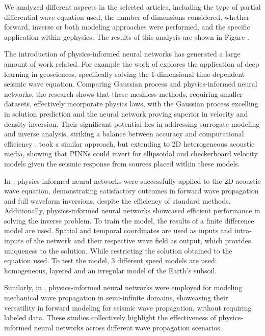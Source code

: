 \documentclass[11pt,twoside]{article}
\begin{document}
We analyzed different aspects in the selected articles, including the type of partial differential wave equation used, the number of dimensions 
considered, whether forward, inverse or both modeling approaches were performed, and the specific application within gephysics. The results 
of this analysis are shown in Figure  .

The introduction of physics-informed neural networks has generated a large amount of work related. For example the work of 
 explores the application of deep learning in geosciences, specifically solving the 1-dimensional 
time-dependent seismic wave equation. Comparing Gaussian process and physics-informed neural networks, the research shows that these meshless 
methods, requiring smaller datasets, effectively incorporate physics laws, with the Gaussian process excelling in solution prediction and the 
neural network proving superior in velocity and density inversion. Their significant potential lies in addressing surrogate modeling and 
inverse analysis, striking a balance between accuracy and computational efficiency \citep{Song2022}.  took a similar 
approach, but extending to 2D heterogeneous acoustic media, showing that PINNs could invert for ellipsoidal and checkerboard velocity models 
given the seismic response from sources placed within these models.

In , physics-informed neural networks were successfully applied to the 2D acoustic wave 
equation, demonstrating satisfactory outcomes in forward wave propagation and full waveform inversions, despite the efficiency of standard 
methods. Additionally, physics-informed neural networks showcased efficient performance in solving the inverse problem. To train the model, 
the results of a finite difference model are used. Spatial and temporal coordinates are used as inputs and intra-inputs of the network and 
their respective wave field as output, which provides uniqueness to the solution. While restricting the solution obtained to the equation 
used. To test the model, 3 different speed models are used: homogeneous, layered and an irregular model of the Earth's subsoil.

Similarly, in , physics-informed neural networks were employed for modeling mechanical wave propagation 
in semi-infinite domains, showcasing their versatility in forward modeling for seismic wave propagation, without requiring labeled data. 
These studies collectively highlight the effectiveness of physics-informed neural networks across different wave propagation scenarios.
\end{document}
